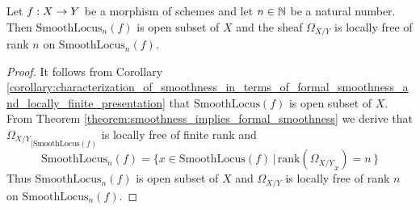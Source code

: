 \begin{corollary}\label{corollary:smooth_locuses_are_open}
Let $f:X\rightarrow Y$ be a morphism of schemes and let $n\in {\mathbb N}$ be a natural number. Then $\mathrm{SmoothLocus}_n(f)$ is open subset of $X$ and the sheaf $\Omega_{X/Y}$ is locally free of rank $n$ on $\mathrm{SmoothLocus}_n(f)$.
\end{corollary}
\begin{proof}
It follows from Corollary \ref{corollary:characterization_of_smoothness_in_terms_of_formal_smoothness_and_locally_finite_presentation} that $\mathrm{SmoothLocus}(f)$ is open subset of $X$. From Theorem \ref{theorem:smoothness_implies_formal_smoothness} we derive that ${\Omega_{X/Y}}_{\mid \mathrm{SmoothLocus}(f)}$ is locally free of finite rank and $$\mathrm{SmoothLocus}_n(f) = \big\{x\in \mathrm{SmoothLocus}(f)\,\big|\,\mathrm{rank}\left({\Omega_{X/Y}}_x\right)=n\, \big\}$$
Thus $\mathrm{SmoothLocus}_n(f)$ is open subset of $X$ and $\Omega_{X/Y}$ is locally free of rank $n$ on $\mathrm{SmoothLocus}_n(f)$.
\end{proof}


